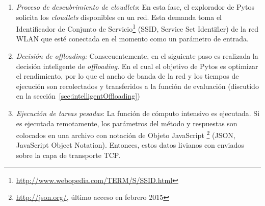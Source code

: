 \begin{enumerate}
 \item \textit{Proceso de descubrimiento de \textit{cloudlets}}: En esta fase, el explorador de Pytos solicita los \textit{cloudlets} disponibles
 en un red. Esta demanda toma el Identificador de Conjunto de Servicio\footnote{\url{http://www.webopedia.com/TERM/S/SSID.html}} (SSID, Service 
 Set Identifier) de la red WLAN que esté conectada en el momento como un parámetro de entrada.
 \item \textit{Decisión de \textit{offloading}:} Consecuentemente, en el siguiente paso es realizada la decisión inteligente de \textit{offloading}.
 En el cual el objetivo de Pytos es optimizar el rendimiento, por lo que el ancho de banda de la red y los tiempos de ejecución son 
 recolectados y transferidos a la función de evaluación (discutido en la sección~\ref{sec:intelligentOffloading})
 \item \textit{Ejecución de tareas pesadas}: La función de cómputo intensivo es ejecutada. Si es ejecutada remotamente, los parámetros del método
 y respuestas son colocados en una archivo con notación de Objeto JavaScript \footnote{\url{http://json.org/}, último acceso en febrero 2015}
 (JSON, JavaScript Object Notation). Entonces, estos datos
 livianos con enviados sobre la capa de transporte TCP.
\end{enumerate}

